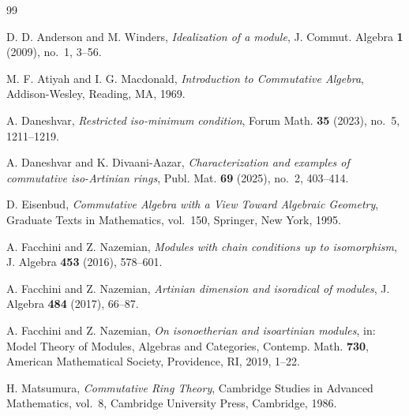 \documentclass[11pt]{article}
\theoremstyle{definition}
\begin{document}
\begin{thebibliography}{99}

D. D. Anderson and M. Winders,
\emph{Idealization of a module},
J. Commut. Algebra \textbf{1} (2009), no.~1, 3--56.


M. F. Atiyah and I. G. Macdonald,
\emph{Introduction to Commutative Algebra},
Addison-Wesley, Reading, MA, 1969.

A. Daneshvar,
\emph{Restricted iso-minimum condition},
Forum Math. \textbf{35} (2023), no.~5, 1211--1219.


A. Daneshvar and K. Divaani-Aazar,
\emph{Characterization and examples of commutative iso-Artinian rings},
Publ. Mat. \textbf{69} (2025), no.~2, 403--414.


D. Eisenbud,
\emph{Commutative Algebra with a View Toward Algebraic Geometry},
Graduate Texts in Mathematics, vol.~150, Springer, New York, 1995.

A. Facchini and Z. Nazemian,
\emph{Modules with chain conditions up to isomorphism},
J. Algebra \textbf{453} (2016), 578--601.


A. Facchini and Z. Nazemian,
\emph{Artinian dimension and isoradical of modules},
J. Algebra \textbf{484} (2017), 66--87.


A. Facchini and Z. Nazemian,
\emph{On isonoetherian and isoartinian modules},
in: Model Theory of Modules, Algebras and Categories,
Contemp. Math. \textbf{730}, American Mathematical Society, Providence, RI, 2019, 1--22.


H. Matsumura,
\emph{Commutative Ring Theory},
Cambridge Studies in Advanced Mathematics, vol.~8,
Cambridge University Press, Cambridge, 1986.

\end{thebibliography}
\end{document}
